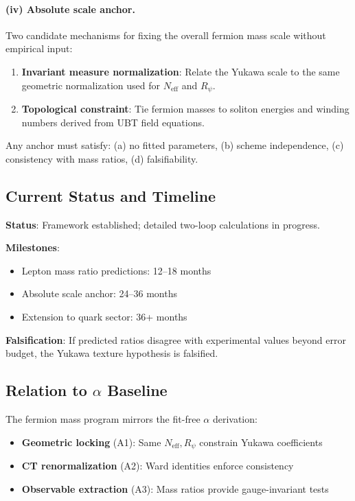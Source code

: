 \documentclass[11pt,a4paper]{article}
\begin{document}
\paragraph{(iv) Absolute scale anchor.}
Two candidate mechanisms for fixing the overall fermion mass scale without empirical input:
\begin{enumerate}
  \item \textbf{Invariant measure normalization}: Relate the Yukawa scale to the same geometric normalization used for $N_{\mathrm{eff}}$ and $R_\psi$.
  \item \textbf{Topological constraint}: Tie fermion masses to soliton energies and winding numbers derived from UBT field equations.
\end{enumerate}

Any anchor must satisfy: (a) no fitted parameters, (b) scheme independence, (c) consistency with mass ratios, (d) falsifiability.

\subsection{Current Status and Timeline}

\textbf{Status}: Framework established; detailed two-loop calculations in progress.

\textbf{Milestones}:
\begin{itemize}
  \item Lepton mass ratio predictions: 12--18 months
  \item Absolute scale anchor: 24--36 months
  \item Extension to quark sector: 36+ months
\end{itemize}

\textbf{Falsification}: If predicted ratios disagree with experimental values beyond error budget, the Yukawa texture hypothesis is falsified.

\subsection{Relation to $\alpha$ Baseline}

The fermion mass program mirrors the fit-free $\alpha$ derivation:
\begin{itemize}
  \item \textbf{Geometric locking} (A1): Same $N_{\mathrm{eff}}, R_\psi$ constrain Yukawa coefficients
  \item \textbf{CT renormalization} (A2): Ward identities enforce consistency
  \item \textbf{Observable extraction} (A3): Mass ratios provide gauge-invariant tests
\end{itemize}
\end{document}
